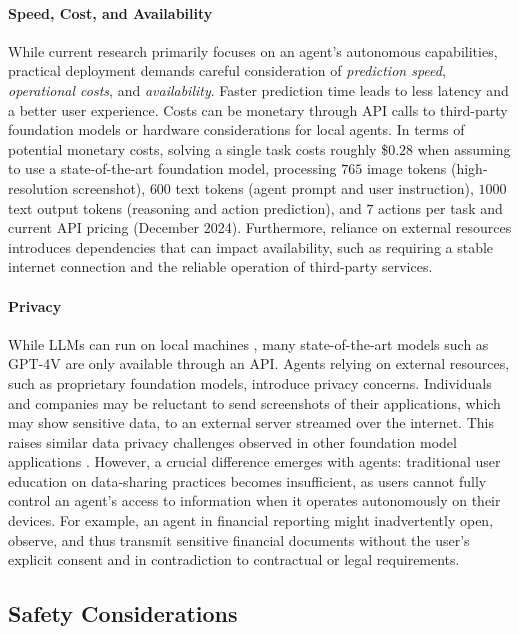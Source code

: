 \paragraph{Speed, Cost, and Availability}
While current research primarily focuses on an agent's autonomous capabilities, practical deployment demands careful consideration of \emph{prediction speed}, \emph{operational costs}, and \emph{availability}.
Faster prediction time leads to less latency and a better user experience.
Costs can be monetary through API calls to third-party foundation models or hardware considerations for local agents.
In terms of potential monetary costs, solving a single task costs roughly \$$0.28$ when assuming to use a state-of-the-art foundation model, processing $765$ image tokens (high-resolution screenshot), $600$ text tokens (agent prompt and user instruction), $1000$ text output tokens (reasoning and action prediction), and $7$ actions per task \citep[as in][]{deng_mind2web_2023} and current API pricing (December 2024).
% 
Furthermore, reliance on external resources introduces dependencies that can impact availability, such as requiring a stable internet connection and the reliable operation of third-party services.

\paragraph{Privacy}
While LLMs can run on local machines \citep{tuggener_so_2024}, many state-of-the-art models such as GPT-4V \citet{openai_gpt-4_2024} are only available through an API.
Agents relying on external resources, such as proprietary foundation models, introduce privacy concerns.
Individuals and companies may be reluctant to send screenshots of their applications, which may show sensitive data, to an external server streamed over the internet.
This raises similar data privacy challenges observed in other foundation model applications \citep{neel_privacy_2024}.
However, a crucial difference emerges with agents: traditional user education on data-sharing practices becomes insufficient, as users cannot fully control an agent's access to information when it operates autonomously on their devices.
For example, an agent in financial reporting might inadvertently open, observe, and thus transmit sensitive financial documents without the user's explicit consent and in contradiction to contractual or legal requirements.

\subsection{Safety Considerations} \label{sec:safety}

